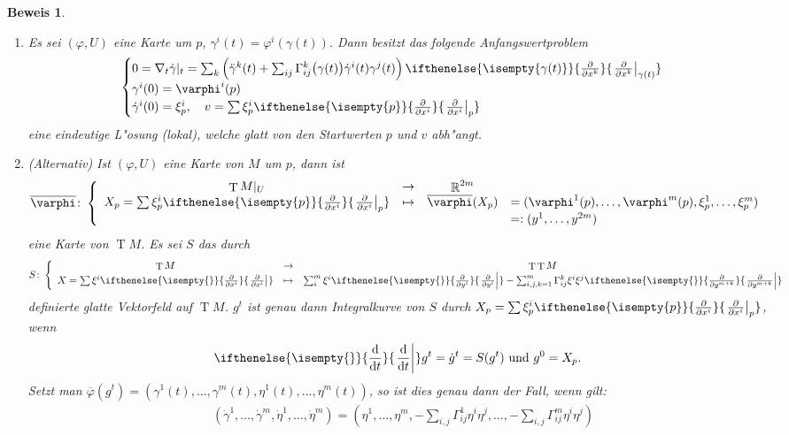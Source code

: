 \documentclass[paper=A4, twoside, chapterprefix=true, bibliography=totoc, headsepline]{scrbook}
\let\temp\phi{}
\let\phi\varphi{}
\let\varphi\temp{}
\let\temp\theta{}
\let\theta\vartheta{}
\let\vartheta\temp{}
\let\temp\epsilon{}
\let\epsilon\varepsilon{}
\let\varepsilon\temp{}
\let\temp\rho{}
\let\rho\varrho{}
\let\varrho\temp{}
\DeclareMathOperator{\R}{\mathbb{R}}
\DeclareMathOperator{\T}{T}         %
\newcommand{\dop}{\mathrm{d}}
\newcommand{\difffrac}[3][]{\ifthenelse{\isempty{#1}}{\frac{\dop #2}{\dop #3}}{\left. \frac{\dop #2}{\dop #3} \right|_{#1}}}
\newcommand{\pdifffrac}[3][]{\ifthenelse{\isempty{#1}}{\frac{\partial #2}{\partial #3}}{\left. \frac{\partial #2}{\partial #3} \right|_{#1}}}
\theoremstyle{plain}
\theoremstyle{nonumberplain}
\newtheorem{bew}{Beweis}
\theoremstyle{empty}
\theoremstyle{break}
\begin{document}
\begin{bew}
  \begin{enumerate}[label=(\Alph*),leftmargin=*,widest=B]
  \item Es sei $(\phi, U)$ eine Karte um $p$, $\gamma^i(t) = \phi^i(\gamma(t))$. Dann besitzt das folgende Anfangswertproblem
    \begin{align*}
      \begin{cases}
        0 = \nabla_t\dot \gamma|_t = \sum_k\left(\ddot \gamma^k(t) + \sum_{ij}\Gamma_{ij}^k\big(\gamma(t)\big)\dot \gamma^i(t)\gamma^j(t)\right) \pdifffrac[\gamma(t)]{}{x^k}\\
        \gamma^i(0) = \phi^i(p)\\
        \dot\gamma^i(0) = \xi_p^i, \quad v = \sum \xi^i_p\pdifffrac[p]{}{x^i}
      \end{cases}
    \end{align*}
    eine eindeutige L"osung (lokal), welche glatt von den Startwerten $p$ und $v$ abh"angt.
  \item (Alternativ) Ist $(\phi, U)$ eine Karte von $M$ um $p$, dann ist
    \[ \overline \phi \colon \left\{\begin{array}{cccl}
        \T M|_U &\to& \R^{2m}&\\
        X_p=\sum \xi_p^i\pdifffrac[p]{}{x^i} &\mapsto& \overline\phi(X_p) &= (\phi^1(p), \ldots, \phi^m(p), \xi_p^1, \ldots, \xi_p^m)\\
        &&& =: (y^1, \ldots, y^{2m})
      \end{array}\right.\]
    eine Karte von $\T M$.	
    Es sei $S$ das durch
    \[ S \colon \left\{ \begin{array}{ccc}
        \T M &\to& \T\T M\\
        X = \sum \xi^i \pdifffrac{}{x^i} &\mapsto& \sum_i^m \xi^i \pdifffrac{}{y^i} - \sum_{i,j,k=1}^{m} \Gamma_{ij}^k \xi^i\xi^j\pdifffrac{}{y^{m+k}}
      \end{array}\right.\]
    definierte glatte Vektorfeld auf $\T M$.	
    $g^t$ ist genau dann Integralkurve von $S$ durch $X_p = \sum \xi_p^i\pdifffrac[p]{}{x^i}$, wenn
    \begin{align*}
      \difffrac{}{t}g^t = \dot g^t = S(g^t) \text{ und } g^0 = X_p.
    \end{align*}
    Setzt man $\overline \phi(g^t) = (\gamma^1(t), \ldots, \gamma^m(t),\eta^1(t), \ldots, \eta^m(t))$, so ist dies genau dann der Fall, wenn gilt:
    \begin{align*}
      & (\dot\gamma^1,\ldots, \dot\gamma^m,\dot\eta^1,\ldots, \dot\eta^m) = \left(\eta^1, \ldots, \eta^m, -\sum_{i,j}\Gamma_{ij}^1\eta^i\eta^j, \ldots, -\sum_{i,j}\Gamma_{ij}^m\eta^i\eta^j\right)\\

\end{align*}
\end{enumerate}
\end{bew}
\end{document}
